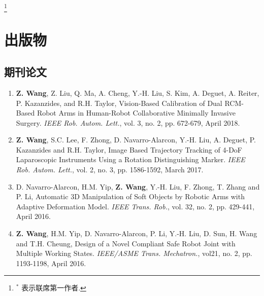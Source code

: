 \documentclass[10pt,letterpaper]{article}
\begin{document}
\let\thefootnote\relax\footnote{$^*$ 表示联席第一作者.}

\section*{出版物}

\subsection*{期刊论文}
\begin{enumerate}
    \item \textbf{Z. Wang}, Z. Liu, Q. Ma, A. Cheng, Y.-H. Liu, S. Kim, A. Deguet, A. Reiter, P. Kazanzides, and R.H. Taylor,
    Vision-Based Calibration of Dual RCM-Based Robot Arms in Human-Robot Collaborative Minimally Invasive Surgery.
    \textit{IEEE Rob. Autom. Lett.}, vol. 3, no. 2, pp. 672-679, April 2018.
    \item \textbf{Z. Wang}, S.C. Lee, F. Zhong, D. Navarro-Alarcon, Y.-H. Liu, A. Deguet, P. Kazanzides and R.H. Taylor,
    Image Based Trajectory Tracking of 4-DoF Laparoscopic Instruments Using a Rotation Distinguishing Marker.
    \textit{IEEE Rob. Autom. Lett.}, vol. 2, no. 3, pp. 1586-1592, March 2017.
    \item D. Navarro-Alarcon, H.M. Yip, \textbf{Z. Wang}, Y.-H. Liu, F. Zhong, T. Zhang and P. Li,
    Automatic 3D Manipulation of Soft Objects by Robotic Arms with Adaptive Deformation Model.
    \textit{{IEEE} Trans. Rob.}, vol. 32, no. 2, pp. 429-441, April 2016.
    \item \textbf{Z. Wang}, H.M. Yip, D. Navarro-Alarcon, P. Li, Y.-H. Liu, D. Sun, H. Wang and T.H. Cheung,
    Design of a Novel Compliant Safe Robot Joint with Multiple Working States.
    \textit{{IEEE/ASME} Trans. Mechatron.}, vol21, no. 2, pp. 1193-1198, April 2016.
\end{enumerate}
\end{document}
